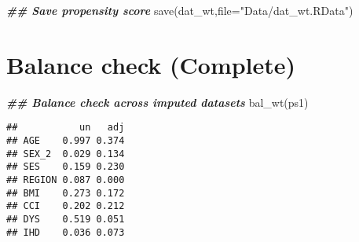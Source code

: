 \documentclass[
]{book}
\newenvironment{Shaded}{\begin{snugshade}}{\end{snugshade}}
\newcommand{\AttributeTok}[1]{\textcolor[rgb]{0.77,0.63,0.00}{#1}}
\newcommand{\ControlFlowTok}[1]{\textcolor[rgb]{0.13,0.29,0.53}{\textbf{#1}}}
\newcommand{\DecValTok}[1]{\textcolor[rgb]{0.00,0.00,0.81}{#1}}
\newcommand{\DocumentationTok}[1]{\textcolor[rgb]{0.56,0.35,0.01}{\textbf{\textit{#1}}}}
\newcommand{\FunctionTok}[1]{\textcolor[rgb]{0.00,0.00,0.00}{#1}}
\newcommand{\NormalTok}[1]{#1}
\newcommand{\OtherTok}[1]{\textcolor[rgb]{0.56,0.35,0.01}{#1}}
\newcommand{\SpecialCharTok}[1]{\textcolor[rgb]{0.00,0.00,0.00}{#1}}
\newcommand{\StringTok}[1]{\textcolor[rgb]{0.31,0.60,0.02}{#1}}
\theoremstyle{definition}
\theoremstyle{definition}
\theoremstyle{definition}
\theoremstyle{definition}
\theoremstyle{remark}
\begin{document}
\begin{Shaded}
\begin{Highlighting}[]
\DocumentationTok{\#\# Save propensity score}
\FunctionTok{save}\NormalTok{(dat\_wt,}\AttributeTok{file=}\StringTok{"Data/dat\_wt.RData"}\NormalTok{)}
\end{Highlighting}
\end{Shaded}

\hypertarget{balance-check-complete-1}{%
\section{Balance check (Complete)}\label{balance-check-complete-1}}

\begin{Shaded}
\end{Shaded}

\begin{Shaded}
\begin{Highlighting}[]
\DocumentationTok{\#\# Balance check across imputed datasets}
\FunctionTok{bal\_wt}\NormalTok{(ps1)}
\end{Highlighting}
\end{Shaded}

\begin{verbatim}
##           un   adj
## AGE    0.997 0.374
## SEX_2  0.029 0.134
## SES    0.159 0.230
## REGION 0.087 0.000
## BMI    0.273 0.172
## CCI    0.202 0.212
## DYS    0.519 0.051
## IHD    0.036 0.073
\end{verbatim}
\end{document}
